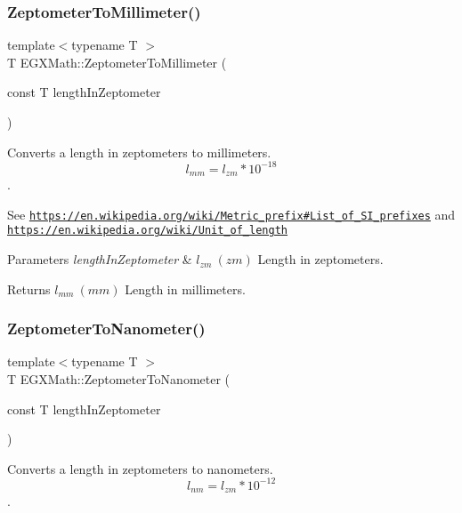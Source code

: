 \subsubsection{\texorpdfstring{Zeptometer\+To\+Millimeter()}{ZeptometerToMillimeter()}}
{\footnotesize\ttfamily template$<$typename T $>$ \\
T E\+G\+X\+Math\+::\+Zeptometer\+To\+Millimeter (\begin{DoxyParamCaption}\item[{const T}]{length\+In\+Zeptometer }\end{DoxyParamCaption})}



Converts a length in zeptometers to millimeters. \[ l_{mm}=l_{zm} * 10^{-18} \]. 

See \href{https://en.wikipedia.org/wiki/Metric_prefix#List_of_SI_prefixes}{\tt https\+://en.\+wikipedia.\+org/wiki/\+Metric\+\_\+prefix\#\+List\+\_\+of\+\_\+\+S\+I\+\_\+prefixes} and \href{https://en.wikipedia.org/wiki/Unit_of_length}{\tt https\+://en.\+wikipedia.\+org/wiki/\+Unit\+\_\+of\+\_\+length} 
\begin{DoxyParams}{Parameters}
{\em length\+In\+Zeptometer} & $ l_{zm}\ (zm)$ Length in zeptometers. \\
\hline
\end{DoxyParams}
\begin{DoxyReturn}{Returns}
$ l_{mm}\ (mm)$ Length in millimeters. 
\end{DoxyReturn}
\mbox{\label{group___e_g_x_math-_conversions-_length_conversions-_s_i-_zeptometer-_s_i_ga0a9d1243a7723cac27aeb6ed48acc3e8}} 
\subsubsection{\texorpdfstring{Zeptometer\+To\+Nanometer()}{ZeptometerToNanometer()}}
{\footnotesize\ttfamily template$<$typename T $>$ \\
T E\+G\+X\+Math\+::\+Zeptometer\+To\+Nanometer (\begin{DoxyParamCaption}\item[{const T}]{length\+In\+Zeptometer }\end{DoxyParamCaption})}



Converts a length in zeptometers to nanometers. \[ l_{nm}=l_{zm} * 10^{-12} \]. 

